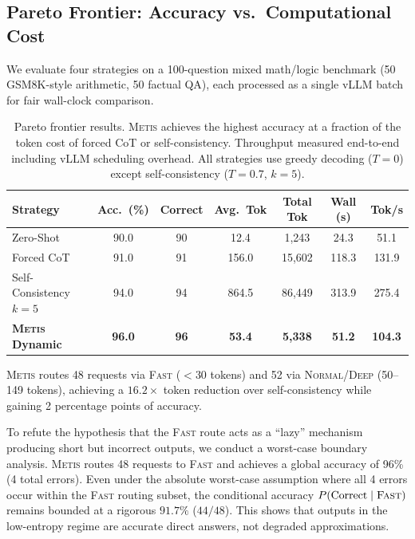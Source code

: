 \documentclass[11pt,a4paper]{article}
\newcommand{\metis}{\textsc{Metis}}
\begin{document}
\subsection{Pareto Frontier: Accuracy vs.\ Computational Cost}
\label{sec:pareto}

We evaluate four strategies on a 100-question mixed math/logic benchmark (50 GSM8K-style arithmetic, 50 factual QA), each processed as a single vLLM batch for fair wall-clock comparison.

\begin{table}[ht]
\centering
\caption{Pareto frontier results. \metis{} achieves the highest accuracy at a fraction of the token cost of forced CoT or self-consistency. Throughput measured end-to-end including vLLM scheduling overhead. All strategies use greedy decoding ($T{=}0$) except self-consistency ($T{=}0.7$, $k{=}5$).}
\label{tab:pareto}
\begin{tabular}{@{}lcccccc@{}}
\toprule
\textbf{Strategy} & \textbf{Acc.\ (\%)} & \textbf{Correct} & \textbf{Avg.\ Tok} & \textbf{Total Tok} & \textbf{Wall (s)} & \textbf{Tok/s} \\
\midrule
Zero-Shot          & 90.0 &  90 &   12.4 &   1{,}243 &  24.3 &  51.1 \\
Forced CoT         & 91.0 &  91 &  156.0 &  15{,}602 & 118.3 & 131.9 \\
Self-Consistency $k{=}5$ & 94.0 &  94 &  864.5 &  86{,}449 & 313.9 & 275.4 \\
\textbf{\metis{} Dynamic} & \textbf{96.0} & \textbf{96} & \textbf{53.4} & \textbf{5{,}338} & \textbf{51.2} & \textbf{104.3} \\
\bottomrule
\end{tabular}
\end{table}

\metis{} routes 48 requests via \textsc{Fast} ($<30$ tokens) and 52 via \textsc{Normal}/\textsc{Deep} (50--149 tokens), achieving a $16.2\times$ token reduction over self-consistency while gaining 2 percentage points of accuracy.

To refute the hypothesis that the \textsc{Fast} route acts as a ``lazy'' mechanism producing short but incorrect outputs, we conduct a worst-case boundary analysis. \metis{} routes 48 requests to \textsc{Fast} and achieves a global accuracy of 96\% (4 total errors). Even under the absolute worst-case assumption where all 4 errors occur within the \textsc{Fast} routing subset, the conditional accuracy $P(\text{Correct} \mid \textsc{Fast})$ remains bounded at a rigorous $91.7\%$ ($44/48$). This shows that outputs in the low-entropy regime are accurate direct answers, not degraded approximations.
\end{document}
